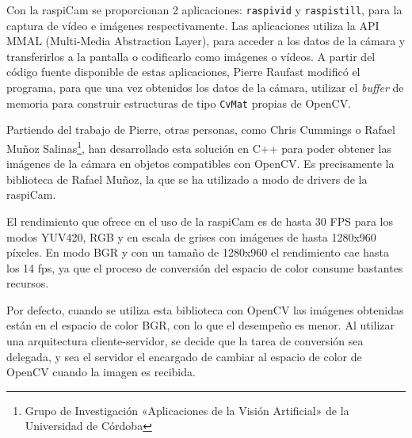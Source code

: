 Con la raspiCam se proporcionan 2 aplicaciones: \texttt{raspivid} y \texttt{raspistill}, para la captura de vídeo e imágenes respectivamente. Las aplicaciones utiliza la API MMAL (Multi-Media Abstraction Layer), para acceder a los datos de la cámara y transferirlos a la pantalla o codificarlo como imágenes o vídeos. A partir del código fuente disponible de estas aplicaciones, Pierre Raufast modificó el programa, para que una vez obtenidos los datos de la cámara, utilizar el \textit{buffer} de memoria para construir estructuras de tipo \texttt{CvMat} propias de OpenCV.

Partiendo del trabajo de Pierre, otras personas, como Chris Cummings o Rafael Muñoz Salinas\footnote{Grupo de Investigación «Aplicaciones de la Visión Artificial» de la Universidad de Córdoba}, han desarrollado esta solución en C++ para poder obtener las imágenes de la cámara en objetos compatibles con OpenCV. Es precisamente la biblioteca de Rafael Muñoz, la que se ha utilizado a modo de drivers de la raspiCam. 

El rendimiento que ofrece en el uso de la raspiCam es de hasta 30 FPS para los modos YUV420, RGB y en escala de grises con imágenes de hasta 1280x960 píxeles. En modo BGR y con un tamaño de 1280x960 el rendimiento cae hasta los 14 fps, ya que el proceso de conversión del espacio de color consume bastantes recursos. 

Por defecto, cuando se utiliza esta biblioteca con OpenCV las imágenes obtenidas están en el espacio de color BGR, con lo que el desempeño es menor. 
Al utilizar una arquitectura cliente-servidor, se decide que la tarea de conversión sea delegada, y sea el servidor el encargado de cambiar al espacio de color de OpenCV cuando la imagen es recibida.

